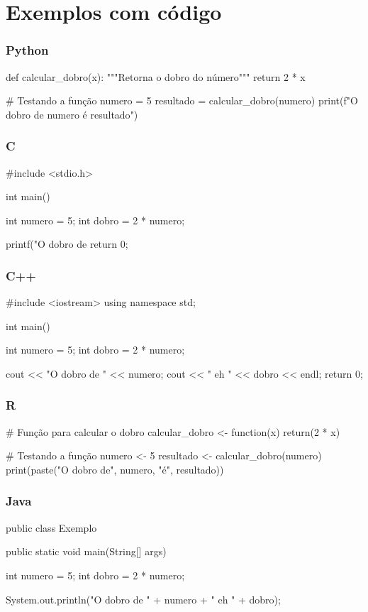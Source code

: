 \section{Exemplos com código}

\begin{frame}[fragile]
    \frametitle{Python}
    
    \begin{python}
def calcular_dobro(x):
    """Retorna o dobro do número"""
    return 2 * x

# Testando a função
numero = 5
resultado = calcular_dobro(numero)
print(f"O dobro de {numero} é {resultado}")
    \end{python}
\end{frame}

\begin{frame}[fragile]
    \frametitle{C}
    
    \begin{clang}
#include <stdio.h>

int main() {
    int numero = 5;
    int dobro = 2 * numero;
    
    printf("O dobro de %
    return 0;
}
    \end{clang}
\end{frame}

\begin{frame}[fragile]
    \frametitle{C++}
    
    \begin{cpp}
#include <iostream>
using namespace std;

int main() {
    int numero = 5;
    int dobro = 2 * numero;
    
    cout << "O dobro de " << numero;
    cout << " eh " << dobro << endl;
    return 0;
}
    \end{cpp}
\end{frame}

\begin{frame}[fragile]
    \frametitle{R}
    
    \begin{rlang}
# Função para calcular o dobro
calcular_dobro <- function(x) {
  return(2 * x)
}

# Testando a função
numero <- 5
resultado <- calcular_dobro(numero)
print(paste("O dobro de", numero, "é", resultado))
    \end{rlang}
\end{frame}

\begin{frame}[fragile]
    \frametitle{Java}
    
    \begin{java}
public class Exemplo {
    public static void main(String[] args) {
        int numero = 5;
        int dobro = 2 * numero;
        
        System.out.println("O dobro de " + numero +
                         " eh " + dobro);
    }
}
    \end{java}
\end{frame}